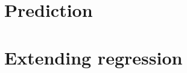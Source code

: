 \documentclass[oneside]{scrbook}
\begin{document}
















\part{Prediction}













\part{Extending regression}












\backmatter 
\end{document}
